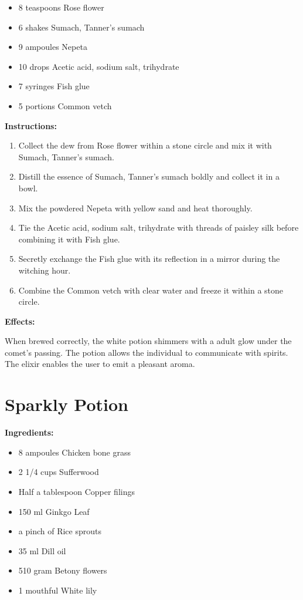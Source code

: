 \documentclass{article}
\begin{document}
\begin{itemize}
  \item 8 teaspoons Rose flower
  \item 6 shakes Sumach, Tanner's sumach
  \item 9 ampoules Nepeta
  \item 10 drops Acetic acid, sodium salt, trihydrate
  \item 7 syringes Fish glue
  \item 5 portions Common vetch
\end{itemize}

\textbf{Instructions:}

\begin{enumerate}
  \item Collect the dew from Rose flower within a stone circle and mix it with Sumach, Tanner's sumach.
  \item Distill the essence of Sumach, Tanner's sumach boldly and collect it in a bowl.
  \item Mix the powdered Nepeta with yellow sand and heat thoroughly.
  \item Tie the Acetic acid, sodium salt, trihydrate with threads of paisley silk before combining it with Fish glue.
  \item Secretly exchange the Fish glue with its reflection in a mirror during the witching hour.
  \item Combine the Common vetch with clear water and freeze it within a stone circle.
\end{enumerate}

\textbf{Effects:}

When brewed correctly, the white potion shimmers with a adult glow under the comet’s passing. The potion allows the individual to communicate with spirits. The elixir enables the user to emit a pleasant aroma.

\newpage
\section*{Sparkly Potion}

\textbf{Ingredients:}

\begin{itemize}
  \item 8 ampoules Chicken bone grass
  \item 2 1/4 cups Sufferwood
  \item Half a tablespoon Copper filings
  \item 150 ml Ginkgo Leaf
  \item a pinch of Rice sprouts
  \item 35 ml Dill oil
  \item 510 gram Betony flowers
  \item 1 mouthful White lily
\end{itemize}
\end{document}
